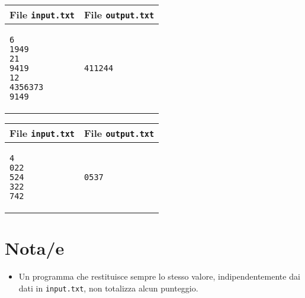 \documentclass[a4paper,11pt]{article}
\begin{document}
  
    \noindent
    \begin{tabular}{p{11cm}|p{5cm}}
    \toprule
    \textbf{File \texttt{input.txt}}
    & \textbf{File \texttt{output.txt}}
    \\
    \midrule
    \scriptsize
    \begin{verbatim}
6
1949
21
9419
12
4356373
9149
\end{verbatim}
    &
    \scriptsize
    \begin{verbatim}
411244
\end{verbatim}
    \\
    \bottomrule
    \end{tabular}
  
    \noindent
    \begin{tabular}{p{11cm}|p{5cm}}
    \toprule
    \textbf{File \texttt{input.txt}}
    & \textbf{File \texttt{output.txt}}
    \\
    \midrule
    \scriptsize
    \begin{verbatim}
4
022
524
322
742
\end{verbatim}
    &
    \scriptsize
    \begin{verbatim}
0537
\end{verbatim}
    \\
    \bottomrule
    \end{tabular}
  
\section*{Nota/e}
\begin{itemize}
  
    \item Un programma che restituisce sempre lo stesso valore,
indipendentemente dai dati in \texttt{input.txt}, non totalizza
alcun punteggio.
\end{itemize}
\end{document}
